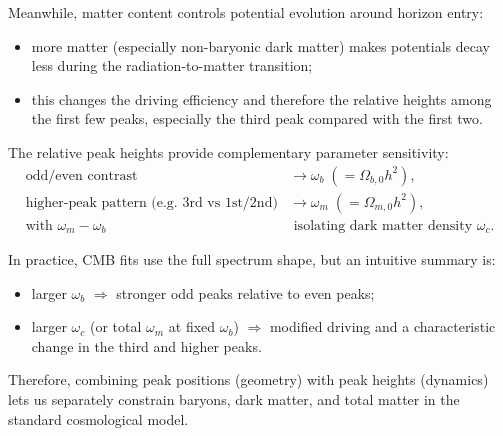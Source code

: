 \begin{foundation}
    Meanwhile, matter content controls potential evolution around horizon entry:
    \begin{itemize}
        \item more matter (especially non-baryonic dark matter) makes potentials decay less during the radiation-to-matter transition;
        \item this changes the driving efficiency and therefore the relative heights among the first few peaks, especially the third peak compared with the first two.
    \end{itemize}
\end{foundation}

\bigskip \noindent
\begin{theory}
    The relative peak heights provide complementary parameter sensitivity:
    \begin{align*}
        \text{odd/even contrast} &\longrightarrow \omega_b \;(=\Omega_{b,0}h^2), \\
        \text{higher-peak pattern (e.g. 3rd vs 1st/2nd)} &\longrightarrow \omega_m \;(=\Omega_{m,0}h^2), \\
        \text{with }\omega_m-\omega_b &\text{ isolating dark matter density }\omega_c.
    \end{align*}

    In practice, CMB fits use the full spectrum shape, but an intuitive summary is:
    \begin{itemize}
        \item larger $\omega_b$ $\Rightarrow$ stronger odd peaks relative to even peaks;
        \item larger $\omega_c$ (or total $\omega_m$ at fixed $\omega_b$) $\Rightarrow$ modified driving and a characteristic change in the third and higher peaks.
    \end{itemize}

    Therefore, combining peak positions (geometry) with peak heights (dynamics) lets us separately constrain baryons, dark matter, and total matter in the standard cosmological model.
\end{theory}

\clearpage
